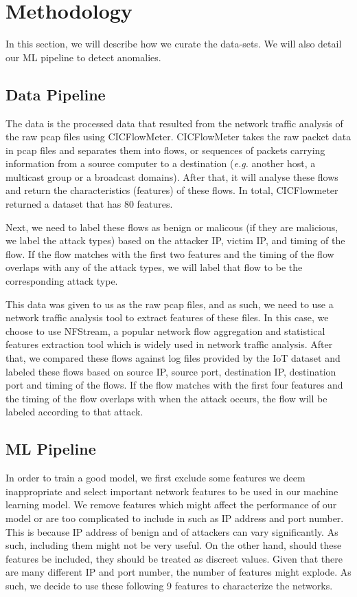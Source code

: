 \section{Methodology}
\label{sec:method}
\begin{method}
In this section, we will describe how we curate the data-sets. We will also detail our ML pipeline to detect anomalies.
\subsection{Data Pipeline}
 The data is the processed data that resulted from the network traffic analysis of the raw pcap files using CICFlowMeter. CICFlowMeter takes the raw packet data in pcap files  and separates them into flows, or sequences of packets carrying information from a source computer to a destination (\textit{e.g.} another host, a multicast group or a broadcast domains). After that, it will analyse these flows and return the characteristics (features) of these flows. In total, CICFlowmeter returned a dataset that has 80 features.

Next, we need to label these flows as benign or malicous (if they are malicious, we label the attack types) based on the attacker IP, victim IP, and timing of the flow. If the flow matches with the first two features and the timing of the flow overlaps with any of the attack types, we will label that flow to be the corresponding attack type. 

This data was given to us as the raw pcap files, and as such, we need to use a network traffic analysis tool to extract features of these files. In this case, we choose to use NFStream, a popular network flow aggregation and statistical features extraction tool which is widely used in network traffic analysis. After that, we compared these flows against log files provided by the IoT dataset and labeled these flows based on source IP, source port, destination IP, destination port and timing of the flows. If the flow matches with the first four features and the timing of the flow overlaps with when the attack occurs, the flow will be labeled according to that attack.

\subsection{ML Pipeline}
 In order to train a good model, we first exclude some features we deem inappropriate and select important network features to be used in our machine learning model. We remove features which might affect the performance of our model or are too complicated to include in such as IP address and port number. This is because IP address of benign and of attackers can vary significantly. As such, including them might not be very useful. On the other hand, should these features be included, they should be treated as discreet values. Given that there are many different IP and port number, the number of features might explode. As such, we decide to use these following 9 features to characterize the networks.



\end{method}
